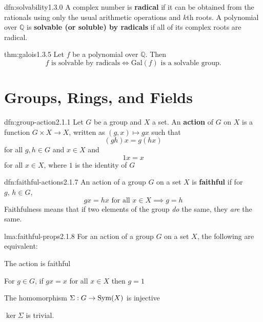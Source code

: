 \documentclass[landscape, 8pt]{extarticle}
\begin{document}
\begin{multicols}{3}
\begin{dfn}{dfn:solvability}{1.3.0}
    A complex number is \textbf{radical} if it can be obtained from the rationals using only the usual arithmetic operations and $k$th roots. A polynomial over $\mathbb{Q}$ is \textbf{solvable (or soluble) by radicals} if all of its complex roots are radical.
\end{dfn}

\begin{thm}[Galois]{thm:galois}{1.3.5}
    Let $f$ be a polynomial over $\mathbb{Q}$. Then
    \[f \text{ is solvable by radicals} \iff \mathrm{Gal}(f) \text{ is a solvable group.}\]
\end{thm}

\section{Groups, Rings, and Fields}

\begin{dfn}{dfn:group-action}{2.1.1}
    Let $G$ be a group and $X$ a set. An \textbf{action} of $G$ on $X$ is a function $G \times X \to X$, written as $(g,x)\mapsto gx$ such that
    \[(gh)x = g(hx)\]
    for all $g, h\in G$ and $x\in X$ and
    \[1x = x\]
    for all $x\in X$, where $1$ is the identity of $G$
\end{dfn}

\begin{dfn}{dfn:faithful-actions}{2.1.7}
    An action of a group $G$ on a set $X$ is \textbf{faithful} if for $g,\,h\in G$,
    \[gx = hx \text{ for all } x\in X \implies g = h\]
    Faithfulness means that if two elements of the group \textit{do} the same, they \textit{are} the same.
\end{dfn}

\begin{lma}{lma:faithful-props}{2.1.8}
    For an action of a group $G$ on a set $X$, the following are equivalent:
    \begin{enumerate-tight}
        \item The action is faithful
        \item For $g\in G$, if $gx = x$ for all $x\in X$ then $g = 1$
        \item The homomorphism $\Sigma : G \to \operatorname{Sym}(X)$ is injective
        \item $\ker \Sigma$ is trivial.
    \end{enumerate-tight}
\end{lma}


\end{multicols}
\end{document}

